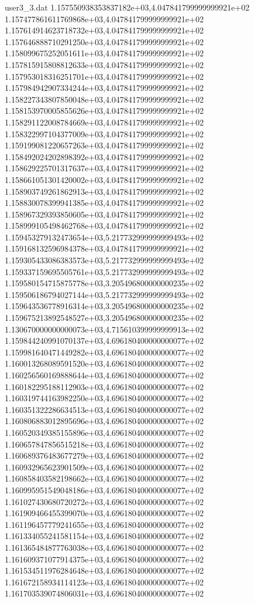\begin{filecontents}{user3_3.dat}
1.157550938353837182e+03,4.047841799999999921e+02
1.157477861611769868e+03,4.047841799999999921e+02
1.157614914623718732e+03,4.047841799999999921e+02
1.157646888710291250e+03,4.047841799999999921e+02
1.158099675252051611e+03,4.047841799999999921e+02
1.157815915808812633e+03,4.047841799999999921e+02
1.157953018316251701e+03,4.047841799999999921e+02
1.157984942907334244e+03,4.047841799999999921e+02
1.158227343807850048e+03,4.047841799999999921e+02
1.158153970005855626e+03,4.047841799999999921e+02
1.158291122008784669e+03,4.047841799999999921e+02
1.158322997104377009e+03,4.047841799999999921e+02
1.159199081220657263e+03,4.047841799999999921e+02
1.158492024202898392e+03,4.047841799999999921e+02
1.158629225701317637e+03,4.047841799999999921e+02
1.158661051301420002e+03,4.047841799999999921e+02
1.158903749261862913e+03,4.047841799999999921e+02
1.158830078399941385e+03,4.047841799999999921e+02
1.158967329393850605e+03,4.047841799999999921e+02
1.158999105498462768e+03,4.047841799999999921e+02
1.159453279132473654e+03,5.217732999999999493e+02
1.159168132596984378e+03,4.047841799999999921e+02
1.159305433086383573e+03,5.217732999999999493e+02
1.159337159695505761e+03,5.217732999999999493e+02
1.159580154715875778e+03,3.205496800000000235e+02
1.159506186794027144e+03,5.217732999999999493e+02
1.159643536778916314e+03,3.205496800000000235e+02
1.159675213892548527e+03,3.205496800000000235e+02
1.130670000000000073e+03,4.715610399999999913e+02
1.159844240991070137e+03,4.696180400000000077e+02
1.159981640471449282e+03,4.696180400000000077e+02
1.160013268089591520e+03,4.696180400000000077e+02
1.160256560169888644e+03,4.696180400000000077e+02
1.160182295188112903e+03,4.696180400000000077e+02
1.160319744163982250e+03,4.696180400000000077e+02
1.160351322286634513e+03,4.696180400000000077e+02
1.160806883012895696e+03,4.696180400000000077e+02
1.160520349385155896e+03,4.696180400000000077e+02
1.160657847856515218e+03,4.696180400000000077e+02
1.160689376483677279e+03,4.696180400000000077e+02
1.160932965623901509e+03,4.696180400000000077e+02
1.160858403582198662e+03,4.696180400000000077e+02
1.160995951549048186e+03,4.696180400000000077e+02
1.161027430680720272e+03,4.696180400000000077e+02
1.161909466455399070e+03,4.696180400000000077e+02
1.161196457779241655e+03,4.696180400000000077e+02
1.161334055241581154e+03,4.696180400000000077e+02
1.161365484877763038e+03,4.696180400000000077e+02
1.161609371077914375e+03,4.696180400000000077e+02
1.161534511976284648e+03,4.696180400000000077e+02
1.161672158934114123e+03,4.696180400000000077e+02
1.161703539074806031e+03,4.696180400000000077e+02

\end{filecontents}
